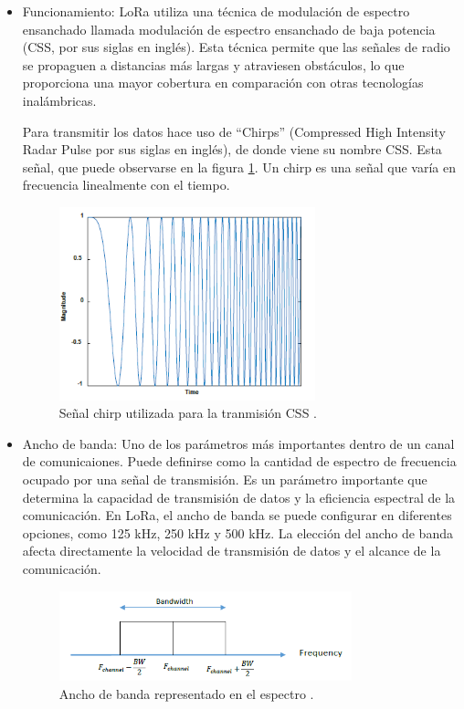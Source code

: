 \begin{itemize}
    \item Funcionamiento: LoRa utiliza una técnica de modulación de espectro ensanchado llamada modulación de espectro ensanchado de baja potencia (CSS, por sus siglas en inglés). Esta técnica permite que las señales de radio se propaguen a distancias más largas y atraviesen obstáculos, lo que proporciona una mayor cobertura en comparación con otras tecnologías inalámbricas.
    
    Para transmitir los datos hace uso de ``Chirps'' (Compressed High Intensity Radar Pulse por sus siglas en inglés), de donde viene su nombre CSS. Esta señal, que puede observarse en la figura \ref{fig:chirp}. Un chirp es una señal que varía en frecuencia linealmente con el tiempo.

    \begin{figure}[H]
        \centering
        \includegraphics[width = 0.7\textwidth]{imagenes/cap1_marcoteo/ChripSignal.png}
        \caption{Señal chirp utilizada para la tranmisión CSS \citep{aloufi2020hybrid}.}
        \label{fig:chirp}
    \end{figure}

    \item Ancho de banda: Uno de los parámetros más importantes dentro de un canal de comunicaiones. Puede definirse como la cantidad de espectro de frecuencia ocupado por una señal de transmisión. Es un parámetro importante que determina la capacidad de transmisión de datos y la eficiencia espectral de la comunicación. En LoRa, el ancho de banda se puede configurar en diferentes opciones, como 125 kHz, 250 kHz y 500 kHz. La elección del ancho de banda afecta directamente la velocidad de transmisión de datos y el alcance de la comunicación.
    
    \begin{figure}[H]
        \centering
        \includegraphics[width = 0.8\textwidth]{imagenes/cap1_marcoteo/AnchodeBandaLoRa.png}
        \caption{Ancho de banda representado en el espectro \citep{aloufi2020hybrid}.}
        \label{fig:anchobanda}
    \end{figure}


\end{itemize}
